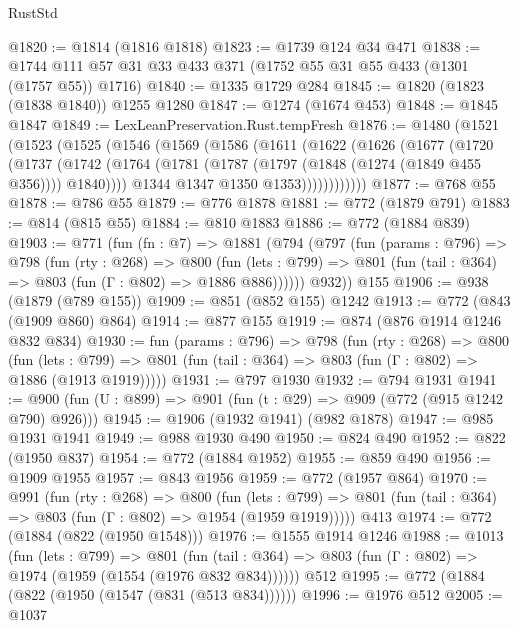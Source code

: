 \begin{lexlean}{RustStd}
\begin{coremodule}
@1820 := @1814 (@1816 @1818)
@1823 := @1739 @124 @34 @471
@1838 := @1744 @111 @57 @31 @33 @433 @371 (@1752 @55 @31 @55 @433 (@1301 (@1757 @55)) @1716)
@1840 := @1335 @1729 @284
@1845 := @1820 (@1823 (@1838 @1840)) @1255 @1280
@1847 := @1274 (@1674 @453)
@1848 := @1845 @1847
@1849 := LexLeanPreservation.Rust.tempFresh
@1876 := @1480
    (@1521
      (@1523
        (@1525
          (@1546
            (@1569
              (@1586
                (@1611
                  (@1622
                    (@1626
                      (@1677
                        (@1720
                          (@1737
                            (@1742
                              (@1764
                                (@1781 (@1787 (@1797 (@1848 (@1274 (@1849 @455 @356)))) @1840))))
                            @1344
                            @1347
                            @1350
                            @1353))))))))))))
@1877 := @768 @55
@1878 := @786 @55
@1879 := @776 @1878
@1881 := @772 (@1879 @791)
@1883 := @814 (@815 @55)
@1884 := @810 @1883
@1886 := @772 (@1884 @839)
@1903 := @771
    (fun (fn : @7) =>
    @1881
      (@794
        (@797
          (fun (params : @796) =>
          @798
            (fun (rty : @268) =>
            @800
              (fun (lets : @799) =>
              @801 (fun (tail : @364) => @803 (fun (Γ : @802) => @1886 @886))))))
        @932))
    @155
@1906 := @938 (@1879 (@789 @155))
@1909 := @851 (@852 @155) @1242
@1913 := @772 (@843 (@1909 @860) @864)
@1914 := @877 @155
@1919 := @874 (@876 @1914 @1246 @832 @834)
@1930 := fun (params : @796) =>
  @798
    (fun (rty : @268) =>
    @800
      (fun (lets : @799) =>
      @801 (fun (tail : @364) => @803 (fun (Γ : @802) => @1886 (@1913 @1919)))))
@1931 := @797 @1930
@1932 := @794 @1931
@1941 := @900 (fun (U : @899) => @901 (fun (t : @29) => @909 (@772 (@915 @1242 @790) @926)))
@1945 := @1906 (@1932 @1941) (@982 @1878)
@1947 := @985 @1931 @1941
@1949 := @988 @1930 @490
@1950 := @824 @490
@1952 := @822 (@1950 @837)
@1954 := @772 (@1884 @1952)
@1955 := @859 @490
@1956 := @1909 @1955
@1957 := @843 @1956
@1959 := @772 (@1957 @864)
@1970 := @991
    (fun (rty : @268) =>
    @800
      (fun (lets : @799) =>
      @801 (fun (tail : @364) => @803 (fun (Γ : @802) => @1954 (@1959 @1919)))))
    @413
@1974 := @772 (@1884 (@822 (@1950 @1548)))
@1976 := @1555 @1914 @1246
@1988 := @1013
    (fun (lets : @799) =>
    @801 (fun (tail : @364) => @803 (fun (Γ : @802) => @1974 (@1959 (@1554 (@1976 @832 @834))))))
    @512
@1995 := @772 (@1884 (@822 (@1950 (@1547 (@831 (@513 @834))))))
@1996 := @1976 @512
@2005 := @1037

\end{coremodule}
\end{lexlean}
